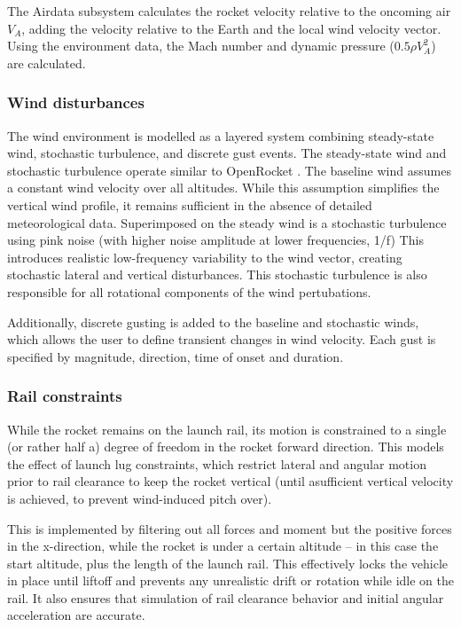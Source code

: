 The Airdata subsystem calculates the rocket velocity relative to the oncoming air $V_A$, adding the velocity relative to the Earth and the local wind velocity vector.
Using the environment data, the Mach number and dynamic pressure ($0.5 \rho V_A^2$) are calculated.


\subsubsection{Wind disturbances}
The wind environment is modelled as a layered system combining steady-state wind, stochastic turbulence, and discrete gust events. 
The steady-state wind and stochastic turbulence operate similar to OpenRocket \cite{niskanen2009}. 
The baseline wind assumes a constant wind velocity over all altitudes. 
While this assumption simplifies the vertical wind profile, it remains sufficient in the absence of detailed meteorological data.
Superimposed on the steady wind is a stochastic turbulence using  pink noise (with higher noise amplitude at lower frequencies, 1/f) 
This introduces realistic low-frequency variability to the wind vector, creating stochastic lateral and vertical disturbances. This stochastic turbulence is also responsible for all rotational components of the wind pertubations. 

Additionally, discrete gusting is added to the baseline and stochastic winds, which allows the user to define transient changes in wind velocity.
Each gust is specified by magnitude, direction, time of onset and duration.

\subsubsection{Rail constraints}
While the rocket remains on the launch rail, its motion is constrained to a single (or rather half a) degree of freedom in the rocket forward direction. 
This models the effect of launch lug constraints, which restrict lateral and angular motion prior to rail clearance to keep the rocket vertical (until  asufficient vertical velocity is achieved, to prevent wind-induced pitch over).

This is implemented by filtering out all forces and moment but the positive forces in the x-direction, while the rocket is under a certain altitude -- in this case the start altitude, plus the length of the launch rail.
This effectively locks the vehicle in place until liftoff and prevents any unrealistic drift or rotation while idle on the rail. It also ensures that simulation of rail clearance behavior and initial angular acceleration are accurate.

